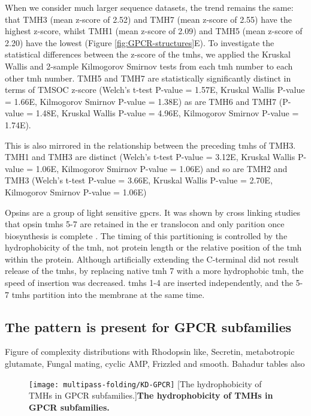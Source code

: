 When we consider much larger sequence datasets, the trend remains the same: that TMH3 (mean z-score of 2.52) and TMH7 (mean z-score of 2.55) have the highest z-score, whilst TMH1 (mean z-score of 2.09) and TMH5 (mean z-score of 2.20) have the lowest (Figure \ref{fig:GPCR-structures}E).
To investigate the statistical differences between the z-score of the \gls{tmh}s, we applied the Kruskal Wallis and 2-sample Kilmogorov Smirnov tests from each \gls{tmh} number to each other \gls{tmh} number.
TMH5 and TMH7 are statistically significantly distinct in terms of TMSOC z-score (Welch's t-test P\--value = 1.57E, Kruskal Wallis P\--value = 1.66E, Kilmogorov Smirnov P\--value = 1.38E) as are TMH6 and TMH7 (P\--value = 1.48E, Kruskal Wallis P\--value = 4.96E, Kilmogorov Smirnov P\--value = 1.74E).

This is also mirrored in the relationship between the preceding \gls{tmh}s of TMH3.
TMH1 and TMH3 are distinct (Welch's t-test P\--value = 3.12E, Kruskal Wallis P\--value = 1.06E, Kilmogorov Smirnov P\--value = 1.06E) and so are TMH2 and TMH3 (Welch's t-test P\--value = 3.66E, Kruskal Wallis P\--value = 2.70E, Kilmogorov Smirnov P\--value = 1.06E)

Opsins are a group of light sensitive \gls{gpcr}s.
It was shown by cross linking studies that opsin \gls{tmh}s 5-7 are retained in the \gls{er} translocon and only parition once biosynthesis is complete \cite{Ismail2008}.
The timing of this partitioning is controlled by the hydrophobicity of the \gls{tmh}, not protein length or the relative position of the \gls{tmh} within the protein.
Although artificially extending the C-terminal did not result release of the \gls{tmh}s, by replacing native \gls{tmh} 7 with a more hydrophobic \gls{tmh}, the speed of insertion was decreased.
\gls{tmh}s 1-4 are inserted independently, and the 5-7 \gls{tmh}s partition into the membrane at the same time.

\subsection{The pattern is present for GPCR subfamilies}
Figure of complexity distributions with Rhodopsin like, Secretin, metabotropic glutamate, Fungal mating, cyclic AMP, Frizzled and smooth.
Bahadur tables also

\begin{figure}[!ht]
\centering
\texttt{[image: multipass-folding/KD-GPCR]}
		[The hydrophobicity of TMHs in GPCR subfamilies.]{\textbf{The hydrophobicity of TMHs in GPCR subfamilies.}}

\label{fig:KD-GPCR}
\end{figure}


